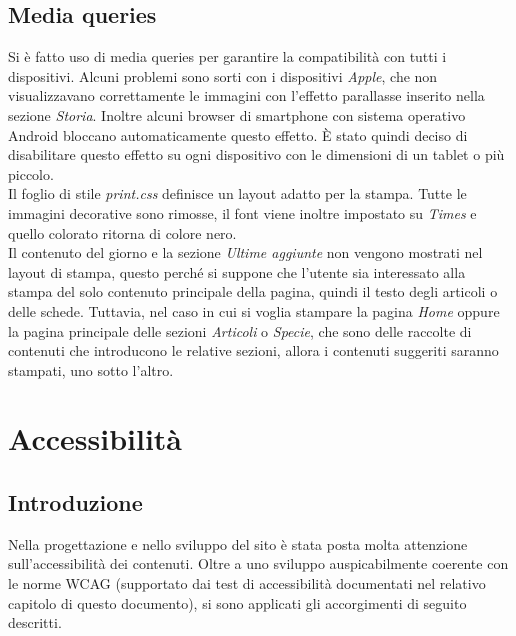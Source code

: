 \documentclass[12pt]{article}
\begin{document}
	\subsection{Media queries}
	Si è fatto uso di media queries per garantire la compatibilità con tutti i dispositivi. Alcuni problemi sono sorti con i dispositivi \textit{Apple}, che non visualizzavano correttamente le immagini con l'effetto parallasse inserito nella sezione \textit{Storia}. Inoltre alcuni browser di smartphone con sistema operativo Android bloccano automaticamente questo effetto. È stato quindi deciso di disabilitare questo effetto su ogni dispositivo con le dimensioni di un tablet o più piccolo.\\
	Il foglio di stile \textit{print.css} definisce un layout adatto per la stampa. Tutte le immagini decorative sono rimosse, il font viene inoltre impostato su \textit{Times} e quello colorato ritorna di colore nero.\\
	Il contenuto del giorno e la sezione \textit{Ultime aggiunte} non vengono mostrati nel layout di stampa, questo perché si suppone che l'utente sia interessato alla stampa del solo contenuto principale della pagina, quindi il testo degli articoli o delle schede. Tuttavia, nel caso in cui si voglia stampare la pagina \textit{Home} oppure la pagina principale delle sezioni \textit{Articoli} o \textit{Specie}, che sono delle raccolte di contenuti che introducono le relative sezioni, allora i contenuti suggeriti saranno stampati, uno sotto l'altro.

		
	\section{Accessibilità}
	\subsection{Introduzione}
	Nella progettazione e nello sviluppo del sito è stata posta molta attenzione sull'accessibilità dei contenuti. Oltre a uno sviluppo auspicabilmente coerente con le norme WCAG (supportato dai test di accessibilità documentati nel relativo capitolo di questo documento), si sono applicati gli accorgimenti di seguito descritti.
	
\end{document}
